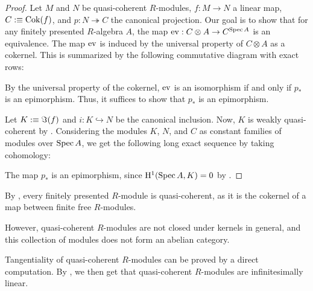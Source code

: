 \begin{proof}
  Let $M$ and $N$ be quasi-coherent $R$-modules, $f : M \to N$ a linear map, $C :\equiv \operatorname{Cok}(f)$, and $p : N \twoheadrightarrow C$ the canonical projection.
  Our goal is to show that for any finitely presented $R$-algebra $A$, the map $\mathrm{ev} : C \otimes A \to C^{\operatorname{Spec} A}$ is an equivalence.
  The map $\mathrm{ev}$ is induced by the universal property of $C \otimes A$ as a cokernel.
  This is summarized by the following commutative diagram with exact rows:
  \begin{center}
  \end{center}
  By the universal property of the cokernel, $\mathrm{ev}$ is an isomorphism if and only if $p_\ast$ is an epimorphism.
  Thus, it suffices to show that $p_\ast$ is an epimorphism.

  Let $K :\equiv \Im(f)$ and $i : K \hookrightarrow N$ be the canonical inclusion.
  Now, $K$ is weakly quasi-coherent by .
  Considering the modules $K$, $N$, and $C$ as constant families of modules over $\operatorname{Spec} A$, we get the following long exact sequence by taking cohomology:
  \begin{center}
  \end{center}
  The map $p_\ast$ is an epimorphism, since $\mathrm{H}^1(\operatorname{Spec} A, K) = 0$ by \cite[Theorem 7.3.6]{draft}.
\end{proof}

\begin{remark}\label{rem:fp-is-qc}
  By , every finitely presented $R$-module is quasi-coherent, as it is the cokernel of a map between finite free $R$-modules.
\end{remark}

However, quasi-coherent $R$-modules are not closed under kernels in general, and this collection of modules does not form an abelian category.

Tangentiality of quasi-coherent $R$-modules can be proved by a direct computation.
By , we then get that quasi-coherent $R$-modules are infinitesimally linear.

